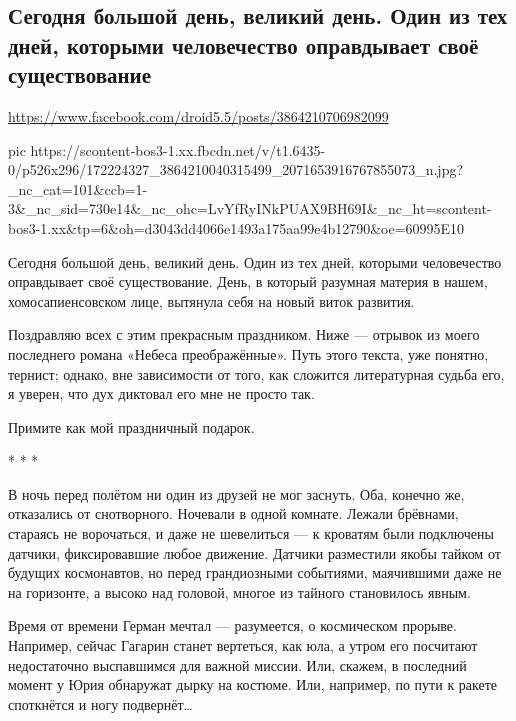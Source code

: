  
 
 
 
 
\subsection{Сегодня большой день, великий день. Один из тех дней, которыми человечество оправдывает своё существование}
\label{sec:12_04_2021.fb.mironenko_vladimir.1.gagarin_titov}
\url{https://www.facebook.com/droid5.5/posts/3864210706982099}

\ifcmt
  pic https://scontent-bos3-1.xx.fbcdn.net/v/t1.6435-0/p526x296/172224327_3864210040315499_2071653916767855073_n.jpg?_nc_cat=101&ccb=1-3&_nc_sid=730e14&_nc_ohc=LvYfRyINkPUAX9BH69I&_nc_ht=scontent-bos3-1.xx&tp=6&oh=d3043dd4066e1493a175aa99e4b12790&oe=60995E10
\fi

Сегодня большой день, великий день. Один из тех дней, которыми человечество
оправдывает своё существование. День, в который разумная материя в нашем,
хомосапиенсовском лице, вытянула себя на новый виток развития.

Поздравляю всех с этим прекрасным праздником. Ниже — отрывок из моего
последнего романа «Небеса преображённые». Путь этого текста, уже понятно,
тернист; однако, вне зависимости от того, как сложится литературная судьба его,
я уверен, что дух диктовал его мне не просто так.

Примите как мой праздничный подарок.

*   *   *

В ночь перед полётом ни один из друзей не мог заснуть. Оба, конечно же,
отказались от снотворного. Ночевали в одной комнате. Лежали брёвнами, стараясь
не ворочаться, и даже не шевелиться — к кроватям были подключены датчики,
фиксировавшие любое движение. Датчики разместили якобы тайком от будущих
космонавтов, но перед грандиозными событиями, маячившими даже не на горизонте,
а высоко над головой, многое из тайного становилось явным.

Время от времени Герман мечтал — разумеется, о космическом прорыве. Например,
сейчас Гагарин станет вертеться, как юла, а утром его посчитают недостаточно
выспавшимся для важной миссии. Или, скажем, в последний момент у Юрия обнаружат
дырку на костюме. Или, например, по пути к ракете споткнётся и ногу подвернёт…

